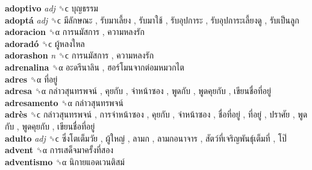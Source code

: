 \textbf{adoptivo} \emph{adj}  ␝ϲ   บุญธรรม   \\
\textbf{adoptá} \emph{adj}  ␝ϲ   มีลักษณะ ,  รับมาเลี้ยง ,  รับมาใช้ ,  รับอุปการะ ,  รับอุปการะเลี้ยงดู ,  รับเป็นลูก   \\
\textbf{adoracion} ␝α   การนมัสการ ,  ความหลงรัก   \\
\textbf{adoradó} ␝ϲ   ผู้หลงใหล   \\
\textbf{adorashon} \emph{n}  ␝ϲ   การนมัสการ ,  ความหลงรัก   \\
\textbf{adrenalina} ␝α   อะดรีนาลิน ,  ฮอร์โมนจากต่อมหมวกไต   \\
\textbf{adres} ␝α   ที่อยู่   \\
\textbf{adresa} ␝α   กล่าวสุนทรพจน์ ,  คุยกับ ,  จ่าหน้าซอง ,  พูดกับ ,  พูดคุยกับ ,  เขียนชื่อที่อยู่   \\
\textbf{adresamento} ␝α   กล่าวสุนทรพจน์   \\
\textbf{adrès} ␝ϲ   กล่าวสุนทรพจน์ ,  การจ่าหน้าซอง ,  คุยกับ ,  จ่าหน้าซอง ,  ชื่อที่อยู่ ,  ที่อยู่ ,  ปราศัย ,  พูดกับ ,  พูดคุยกับ ,  เขียนชื่อที่อยู่   \\
\textbf{adulto} \emph{adj}  ␝ϲ   ซึ่งโตเต็มวัย ,  ผู้ใหญ่ ,  ลามก ,  ลามกอนาจาร ,  สัตว์ที่เจริญพันธุ์เต็มที่ ,  โป๊   \\
\textbf{advent} ␝α   การเสด็จมาครั้งที่สอง   \\
\textbf{adventismo} ␝α   นิกายแอดเวนติสม์   \\
